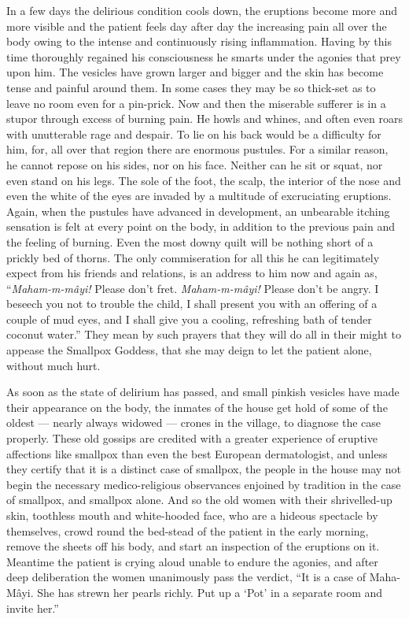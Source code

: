 \documentclass[a4paper, 12pt, oneside, english, twocolumn]{article}
\begin{document}
In a few days the delirious condition cools down, the eruptions become more and more visible and the patient feels day after day the increasing pain all over the body owing to the intense and continuously rising inflammation. Having by this time thoroughly regained his consciousness he smarts under the agonies that prey upon him. The vesicles have grown larger and bigger and the skin has become tense and painful around them. In some cases they may be so thick-set as to leave no room even for a pin-prick. Now and then the miserable sufferer is in a stupor through excess of burning pain. He howls and whines, and often even roars with unutterable rage and despair. To lie on his back would be a difficulty for him, for, all over that region there are enormous pustules. For a similar reason, he cannot repose on his sides, nor on his face. Neither can he sit or squat, nor even stand on his legs. The sole of the foot, the scalp, the interior of the nose and even the white of the eyes are invaded by a multitude of excruciating eruptions. Again, when the pustules have advanced in development, an unbearable itching sensation is felt at every point on the body, in addition to the previous pain and the feeling of burning. Even the most downy quilt will be nothing short of a prickly bed of thorns. The only commiseration for all this he can legitimately expect from his friends and relations, is an address to him now and again as, ``\emph{Maham-m-mâyi!} Please don't fret. \emph{Maham-m-mâyi!} Please don't be angry. I beseech you not to trouble the child, I shall present you with an offering of a couple of mud eyes, and I shall give you a cooling, refreshing bath of tender coconut water.'' They mean by such prayers that they will do all in their might to appease the Smallpox Goddess, that she may deign to let the patient alone, without much hurt.

As soon as the state of delirium has passed, and small pinkish vesicles have made their appearance on the body, the inmates of the house get hold of some of the oldest --- nearly always widowed --- crones in the village, to diagnose the case properly. These old gossips are credited with a greater experience of eruptive affections like smallpox than even the best European dermatologist, and unless they certify that it is a distinct case of smallpox, the people in the house may not begin the necessary medico-religious observances enjoined by tradition in the case of smallpox, and smallpox alone. And so the old women with their shrivelled-up skin, toothless mouth and white-hooded face, who are a hideous spectacle by themselves, crowd round the bed-stead of the patient in the early morning, remove the sheets off his body, and start an inspection of the eruptions on it. Meantime the patient is crying aloud unable to endure the agonies, and after deep deliberation the women unanimously pass the verdict, ``It is a case of Maha-Mâyi. She has strewn her pearls richly. Put up a `Pot' in a separate room and invite her.''
\end{document}
